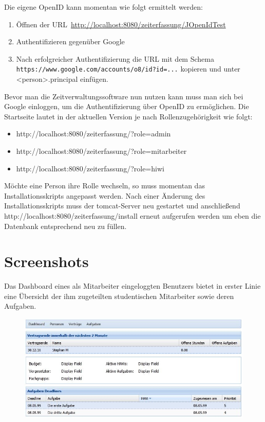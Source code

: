 \documentclass[article,colorback,accentcolor=tud2c]{tudreport}
\begin{document}
Die eigene OpenID kann momentan wie folgt ermittelt werden:

\begin{enumerate}
    \item Öffnen der URL~\url{http://localhost:8080/zeiterfassung/JOpenIdTest}
    \item Authentifizieren gegenüber Google
    \item Nach erfolgreicher Authentifizierung die URL mit dem Schema \texttt{https://www.google.com/accounts/o8/id?id=...} kopieren und unter <person>.principal einfügen.
\end{enumerate}

Bevor man die Zeitverwaltungssoftware nun nutzen kann muss man sich bei Google einloggen, um die Authentifizierung über OpenID zu ermöglichen. Die Startseite lautet in der aktuellen Version je nach Rollenzugehörigkeit wie folgt:
\begin{itemize}
\item http://localhost:8080/zeiterfassung/?role=admin
\item http://localhost:8080/zeiterfassung/?role=mitarbeiter
\item http://localhost:8080/zeiterfassung/?role=hiwi
\end{itemize}

Möchte eine Person ihre Rolle wechseln, so muss momentan das Installationsskripts angepasst werden. Nach einer Änderung des Installationsskripts muss der tomcat-Server neu gestartet und anschließend http://localhost:8080/zeiterfassung/install erneut aufgerufen werden um eben die Datenbank entsprechend neu zu füllen.


\section{Screenshots} %
\label{sec:screenshots}

Das Dashboard eines als Mitarbeiter eingeloggten Benutzers bietet in erster Linie eine Übersicht der ihm zugeteilten studentischen Mitarbeiter sowie deren Aufgaben.

\begin{figure}[h]
    \begin{center}
        \includegraphics[scale=0.8]{img/mitarbeiter-dashboard}
    \end{center}
\end{figure}
\end{document}
